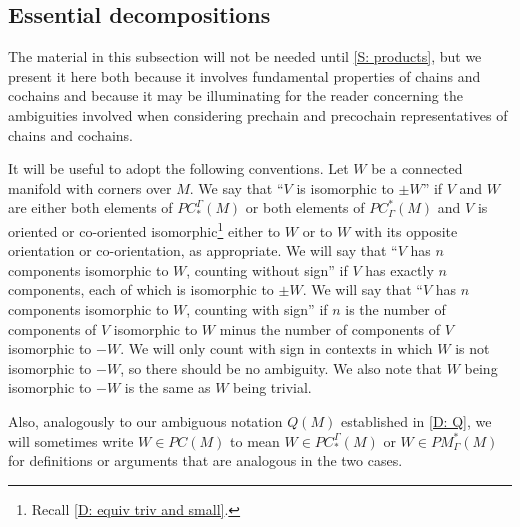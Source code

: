 \subsection{Essential decompositions}\label{S: essential decomp}

The material in this subsection will not be needed until \cref{S: products}, but we present it here both because it involves fundamental properties of chains and cochains and because it may be illuminating for the reader concerning the ambiguities involved when considering prechain and precochain representatives of chains and cochains.


It will be useful to adopt the following conventions.
Let $W$ be a connected manifold with corners over $M$.
We say that ``$V$ is isomorphic to $\pm W$'' if $V$ and $W$ are either both elements of $PC_*^\Gamma(M)$ or both elements of $PC^*_\Gamma(M)$ and $V$ is oriented or co-oriented isomorphic\footnote{Recall \cref{D: equiv triv and small}.} either to $W$ or to $W$ with its opposite orientation or co-orientation, as appropriate.
We will say that ``$V$ has $n$ components isomorphic to $W$, counting without sign'' if $V$ has exactly $n$ components, each of which is isomorphic to $\pm W$.
We will say that ``$V$ has $n$ components isomorphic to $W$, counting with sign'' if $n$ is the number of components of $V$ isomorphic to $W$ minus the number of components of $V$ isomorphic to $-W$.
We will only count with sign in contexts in which $W$ is not isomorphic to $-W$, so there should be no ambiguity.
We also note that $W$ being isomorphic to $-W$ is the same as $W$ being trivial.

Also, analogously to our ambiguous notation $Q(M)$ established in \cref{D: Q}, we will sometimes write $W \in PC(M)$ to mean $W \in PC^\Gamma_*(M)$ or $W \in PM_\Gamma^*(M)$ for definitions or arguments that are analogous in the two cases.


